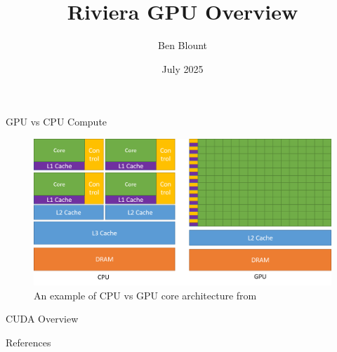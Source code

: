 \documentclass[aspectratio=169]{beamer}
\title{Riviera GPU Overview}
\author{Ben Blount}
\institute{Data Science Research Institute}
\date{July 2025}
\begin{document}
\maketitleframe 

\begin{frame}{GPU vs CPU Compute}
    \begin{figure}
        \centering
        \includegraphics[scale=.4]{figures/gpu-vs-cpu.png}
        \caption{An example of CPU vs GPU core architecture from \textcite{nivdiaCuda}}    
    \end{figure}
\end{frame}

\begin{frame}{CUDA Overview}
    
\end{frame}

\begin{frame}{References}
    \printbibliography[heading=bibintoc]
\end{frame}
\end{document}
